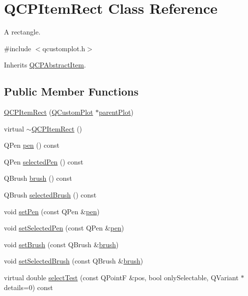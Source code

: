 \hypertarget{class_q_c_p_item_rect}{\section{Q\-C\-P\-Item\-Rect Class Reference}
\label{class_q_c_p_item_rect}
}


A rectangle.  




{\ttfamily \#include $<$qcustomplot.\-h$>$}



Inherits \hyperlink{class_q_c_p_abstract_item}{Q\-C\-P\-Abstract\-Item}.

\subsection*{Public Member Functions}
\begin{DoxyCompactItemize}
\item 
\hyperlink{class_q_c_p_item_rect_a412ad1579f7a1fba453d0fa28c496cbc}{Q\-C\-P\-Item\-Rect} (\hyperlink{class_q_custom_plot}{Q\-Custom\-Plot} $\ast$\hyperlink{class_q_c_p_layerable_ab7e0e94461566093d36ffc0f5312b109}{parent\-Plot})
\item 
virtual \hyperlink{class_q_c_p_item_rect_af9e89f80457afc2d0fd2c6527b40a5f2}{$\sim$\-Q\-C\-P\-Item\-Rect} ()
\item 
Q\-Pen \hyperlink{class_q_c_p_item_rect_a3cb7b6de5e82cc5a3c99e9de919a55e6}{pen} () const 
\item 
Q\-Pen \hyperlink{class_q_c_p_item_rect_a7e701c34e72a4c25647e93fa369f395c}{selected\-Pen} () const 
\item 
Q\-Brush \hyperlink{class_q_c_p_item_rect_a03d2d26ffcac78b25b8e90915f9c4abe}{brush} () const 
\item 
Q\-Brush \hyperlink{class_q_c_p_item_rect_a3b586228393f5c8efa78c4d2a4b25cbf}{selected\-Brush} () const 
\item 
void \hyperlink{class_q_c_p_item_rect_a483c0da5a17e1646cd17ddea2c124e7d}{set\-Pen} (const Q\-Pen \&\hyperlink{class_q_c_p_item_rect_a3cb7b6de5e82cc5a3c99e9de919a55e6}{pen})
\item 
void \hyperlink{class_q_c_p_item_rect_a52a1bcb2dc753a538e406a2ba3cf21ce}{set\-Selected\-Pen} (const Q\-Pen \&\hyperlink{class_q_c_p_item_rect_a3cb7b6de5e82cc5a3c99e9de919a55e6}{pen})
\item 
void \hyperlink{class_q_c_p_item_rect_abbd4e346a03513ee466afc25d9c75446}{set\-Brush} (const Q\-Brush \&\hyperlink{class_q_c_p_item_rect_a03d2d26ffcac78b25b8e90915f9c4abe}{brush})
\item 
void \hyperlink{class_q_c_p_item_rect_abd1792859844118dedee86223cede7af}{set\-Selected\-Brush} (const Q\-Brush \&\hyperlink{class_q_c_p_item_rect_a03d2d26ffcac78b25b8e90915f9c4abe}{brush})
\item 
virtual double \hyperlink{class_q_c_p_item_rect_af13b0797079b40b73d1c7286b76f18ac}{select\-Test} (const Q\-Point\-F \&pos, bool only\-Selectable, Q\-Variant $\ast$details=0) const 
\end{DoxyCompactItemize}
